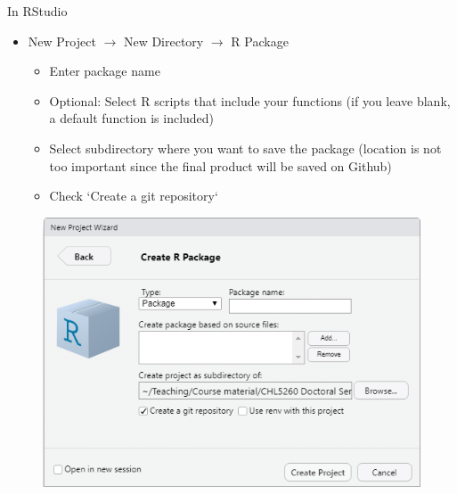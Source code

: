 \documentclass[
  ignorenonframetext,
]{beamer}
\providecommand{\tightlist}{%
  \setlength{\itemsep}{0pt}\setlength{\parskip}{0pt}}
\begin{document}
\begin{frame}{In RStudio}
\protect\hypertarget{in-rstudio}{}

\begin{itemize}
\tightlist
\item
  New Project \(\rightarrow\) New Directory \(\rightarrow\) R Package

  \begin{itemize}
  \tightlist
  \item
    Enter package name
  \item
    Optional: Select R scripts that include your functions (if you leave
    blank, a default function is included)
  \item
    Select subdirectory where you want to save the package (location is
    not too important since the final product will be saved on Github)
  \item
    Check \alert{`Create a git repository`}
  \end{itemize}
\end{itemize}

\begin{figure}
  \includegraphics[scale=0.4]{slides_files/figure-beamer/Rstudio_packagesetup.png}
\end{figure}

\end{frame}
\end{document}
